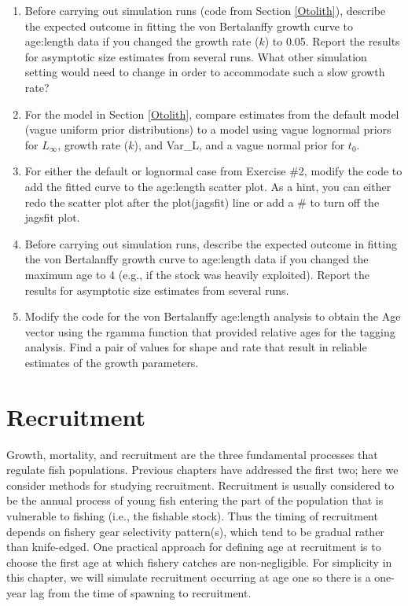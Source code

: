 \documentclass[
]{krantz}
\begin{document}
\begin{enumerate}
\def\labelenumi{\arabic{enumi}.}
\item
  Before carrying out simulation runs (code from Section \ref{Otolith}), describe the expected outcome in fitting the von Bertalanffy growth curve to age:length data if you changed the growth rate (\(k\)) to 0.05. Report the results for asymptotic size estimates from several runs. What other simulation setting would need to change in order to accommodate such a slow growth rate?
\item
  For the model in Section \ref{Otolith}, compare estimates from the default model (vague uniform prior distributions) to a model using vague lognormal priors for \(L_\infty\), growth rate (\(k\)), and Var\_L, and a vague normal prior for \(t_0\).
\item
  For either the default or lognormal case from Exercise \#2, modify the code to add the fitted curve to the age:length scatter plot. As a hint, you can either redo the scatter plot after the plot(jagsfit) line or add a \# to turn off the jagsfit plot.
\item
  Before carrying out simulation runs, describe the expected outcome in fitting the von Bertalanffy growth curve to age:length data if you changed the maximum age to 4 (e.g., if the stock was heavily exploited). Report the results for asymptotic size estimates from several runs.
\item
  Modify the code for the von Bertalanffy age:length analysis to obtain the Age vector using the rgamma function that provided relative ages for the tagging analysis. Find a pair of values for shape and rate that result in reliable estimates of the growth parameters.
\end{enumerate}

\hypertarget{Recruit}{%
\chapter{Recruitment}\label{Recruit}}

Growth, mortality, and recruitment are the three fundamental processes that regulate fish populations. Previous chapters have addressed the first two; here we consider methods for studying recruitment. Recruitment is usually considered to be the annual process of young fish entering the part of the population that is vulnerable to fishing (i.e., the fishable stock). Thus the timing of recruitment depends on fishery gear selectivity pattern(s), which tend to be gradual rather than knife-edged. One practical approach for defining age at recruitment is to choose the first age at which fishery catches are non-negligible. For simplicity in this chapter, we will simulate recruitment occurring at age one so there is a one-year lag from the time of spawning to recruitment.
\end{document}
